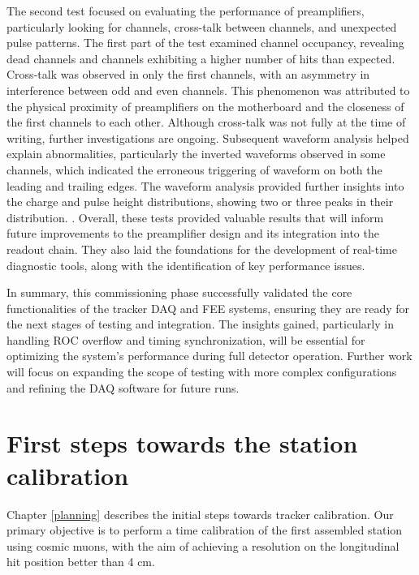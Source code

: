The second test focused on evaluating the 
performance of preamplifiers, 
particularly looking for  channels, 
cross-talk between  channels, 
and unexpected pulse patterns. The first part 
of the test examined  channel occupancy, revealing 
dead channels and channels exhibiting a higher 
number of hits than expected. 
Cross-talk was observed in only the first channels, 
with an asymmetry in interference 
between odd and even channels. This phenomenon was 
attributed to the physical proximity 
of preamplifiers on the motherboard and the 
closeness of the first channels to each other. 
Although  cross-talk was not fully  at 
the time of writing, further investigations 
are ongoing.
Subsequent waveform analysis helped explain 
abnormalities, particularly the inverted 
waveforms observed in some channels, which indicated 
the erroneous triggering of waveform 
on both the leading and trailing edges. The 
waveform analysis 
provided further insights into the charge and 
pulse height distributions, showing two or 
three peaks in their distribution. . 
%
Overall, 
these tests provided valuable results 
that will inform future improvements to the 
preamplifier design and its integration into 
the readout chain. They also laid the foundations 
for the development of real-time 
diagnostic tools, along with the identification of 
key performance issues.

In summary, this commissioning phase successfully validated 
the core functionalities 
of the tracker DAQ and FEE systems, ensuring they are ready 
for the next stages of 
testing and integration. The insights gained, particularly 
in handling ROC overflow 
and timing synchronization, will be essential for optimizing 
the system's performance 
during full detector operation. Further work will focus on 
expanding the scope of 
testing with more complex configurations and refining the 
DAQ software for future runs.


\section{First steps towards the station calibration}
Chapter \ref{planning} describes the initial steps towards 
 tracker calibration. Our primary objective is to perform a time calibration of 
the first assembled station using cosmic muons, with the aim of achieving 
a resolution on the longitudinal hit position better than 4 cm. 

